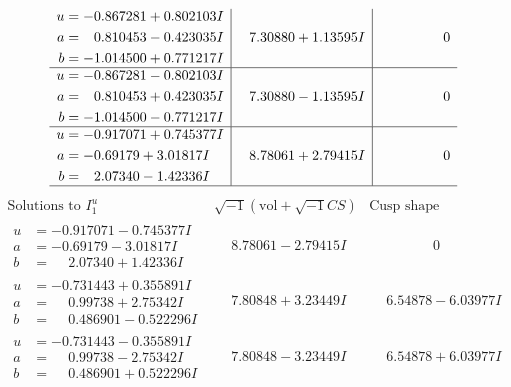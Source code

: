 \documentclass[1p]{elsarticle_modified}
\theoremstyle{definition}
\newcommand{\I}{\sqrt{-1}}
\begin{document}
$$\begin{array}{c|c|c}
\begin{aligned}
u &= -0.867281 + 0.802103 I \\
a &= \phantom{-}0.810453 - 0.423035 I \\
b &= -1.014500 + 0.771217 I\end{aligned}
 & \phantom{-}7.30880 + 1.13595 I & \phantom{-0.000000 } 0 \\ \hline\begin{aligned}
u &= -0.867281 - 0.802103 I \\
a &= \phantom{-}0.810453 + 0.423035 I \\
b &= -1.014500 - 0.771217 I\end{aligned}
 & \phantom{-}7.30880 - 1.13595 I & \phantom{-0.000000 } 0 \\ \hline\begin{aligned}
u &= -0.917071 + 0.745377 I \\
a &= -0.69179 + 3.01817 I \\
b &= \phantom{-}2.07340 - 1.42336 I\end{aligned}
 & \phantom{-}8.78061 + 2.79415 I & \phantom{-0.000000 } 0\\
 \hline 
 \end{array}$$\newpage$$\begin{array}{c|c|c}  
\text{Solutions to }I^u_{1}& \I (\text{vol} + \sqrt{-1}CS) & \text{Cusp shape}\\
 \hline 
\begin{aligned}
u &= -0.917071 - 0.745377 I \\
a &= -0.69179 - 3.01817 I \\
b &= \phantom{-}2.07340 + 1.42336 I\end{aligned}
 & \phantom{-}8.78061 - 2.79415 I & \phantom{-0.000000 } 0 \\ \hline\begin{aligned}
u &= -0.731443 + 0.355891 I \\
a &= \phantom{-}0.99738 + 2.75342 I \\
b &= \phantom{-}0.486901 - 0.522296 I\end{aligned}
 & \phantom{-}7.80848 + 3.23449 I & \phantom{-}6.54878 - 6.03977 I \\ \hline\begin{aligned}
u &= -0.731443 - 0.355891 I \\
a &= \phantom{-}0.99738 - 2.75342 I \\
b &= \phantom{-}0.486901 + 0.522296 I\end{aligned}
 & \phantom{-}7.80848 - 3.23449 I & \phantom{-}6.54878 + 6.03977 I \\ \hline\begin{aligned}

\end{aligned}
\end{array}$$
\end{document}
